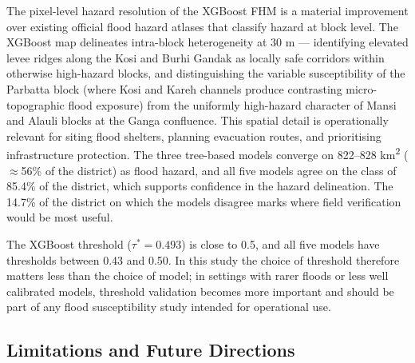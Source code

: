 \documentclass[12pt, a4paper]{article}
\begin{document}
The pixel-level hazard resolution of the XGBoost FHM is a material improvement over existing official flood hazard atlases \citep{bhuvan2010} that classify hazard at block level. The XGBoost map delineates intra-block heterogeneity at 30 m --- identifying elevated levee ridges along the Kosi and Burhi Gandak as locally safe corridors within otherwise high-hazard blocks, and distinguishing the variable susceptibility of the Parbatta block (where Kosi and Kareh channels produce contrasting micro-topographic flood exposure) from the uniformly high-hazard character of Mansi and Alauli blocks at the Ganga confluence. This spatial detail is operationally relevant for siting flood shelters, planning evacuation routes, and prioritising infrastructure protection. The three tree-based models converge on 822--828 km\textsuperscript{2} ($\approx$56\% of the district) as flood hazard, and all five models agree on the class of 85.4\% of the district, which supports confidence in the hazard delineation. The 14.7\% of the district on which the models disagree marks where field verification would be most useful.

The XGBoost threshold ($\tau^* = 0.493$) is close to 0.5, and all five models have thresholds between 0.43 and 0.50. In this study the choice of threshold therefore matters less than the choice of model; in settings with rarer floods or less well calibrated models, threshold validation becomes more important and should be part of any flood susceptibility study intended for operational use.

\subsection{Limitations and Future Directions}
\end{document}
